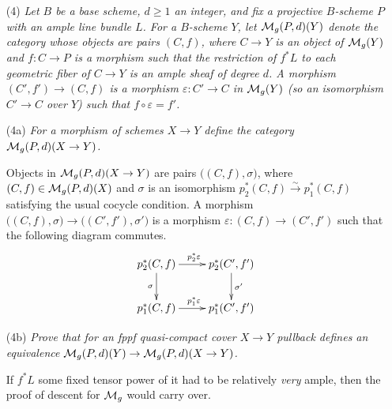 \begin{itemize}
\item[(4)] \textit{Let $B$ be a base scheme, $d\ge 1$ an integer, and fix a projective
$B$-scheme $P$ with an ample line bundle $L$. For a $B$-scheme $Y$, let $\mathcal{M}_g(P,d)(Y)$
denote the category whose objects are pairs $(C,f)$, where $C\to Y$ is an object of
$\mathcal{M}_g(Y)$ and $f:C\to P$ is a morphism such that the restriction of $f^*L$ to each
geometric fiber of $C\to Y$ is an ample sheaf of degree $d$. A morphism $(C',f')\to
(C,f)$ is a morphism $\varepsilon:C'\to C$ in $\mathcal{M}_g(Y)$ (so an isomorphism $C'\to C$ over
$Y$) such that $f\circ \varepsilon=f'$.}

\item [(4a)] \textit{For a morphism of schemes $X\to Y$ define the category
$\mathcal{M}_g(P,d)(X\to Y)$.}

Objects in $\mathcal{M}_g(P,d)(X\to Y)$ are pairs $\bigl((C,f),\sigma\bigr)$, where $(C,f)\in
\mathcal{M}_g(P,d)(X)$ and $\sigma$ is an isomorphism $p_2^*(C,f)\xrightarrow\sim p_1^*(C,f)$
satisfying the usual cocycle condition. A morphism $\bigl((C,f),\sigma\bigr)\to
\bigl((C',f'),\sigma'\bigr)$ is a morphism $\varepsilon:(C,f)\to (C',f')$ such that the
following diagram commutes.
\[\xymatrix{
   p_2^*(C,f) \ar[d]_\sigma \ar[r]^{p_2^*\varepsilon} & p_2^*(C',f') \ar[d]^{\sigma'}\\
   p_1^*(C,f) \ar[r]^{p_1^*\varepsilon} & p_1^*(C',f')
}\]

\item[(4b)] \textit{Prove that for an fppf quasi-compact cover $X\to Y$ pullback defines
an equivalence $\mathcal{M}_g(P,d)(Y)\to\mathcal{M}_g(P,d)(X\to Y)$.}

If $f^*L$ some fixed tensor power of it had to be relatively \emph{very} ample, then the
proof of descent for $\mathcal{M}_g$ would carry over.

\end{itemize}




